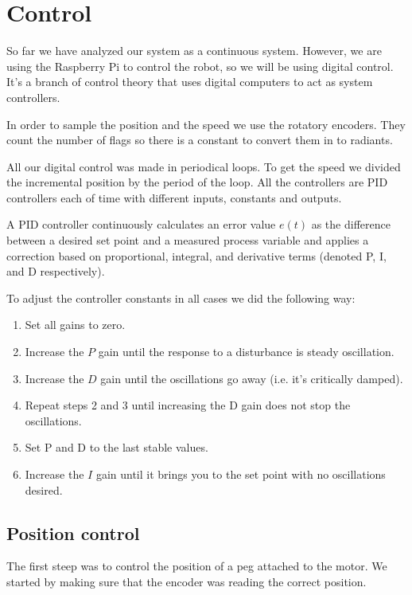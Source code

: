 \section{Control}
So far we have analyzed our system as a continuous system.
However, we are using the Raspberry Pi to control the robot, so we will
be using digital control. It's a branch of control theory that uses
digital computers to act as system controllers.

In order to sample the position and the speed we use the rotatory encoders.
They count the number of flags so there is a constant to convert them in to radiants.

All our digital control was made in periodical loops. To get the speed we
divided the incremental position by the period of the loop. All the controllers
are PID controllers each of time with different inputs, constants and outputs.

A PID controller continuously calculates an error value $e(t)$ as the difference between
a desired set point and a measured process variable and applies a
correction based on proportional, integral, and derivative terms
(denoted P, I, and D respectively).

To adjust the controller constants in all cases we did the following way:

\begin{enumerate}
    \item Set all gains to zero.
    \item Increase the $P$ gain until the response to a disturbance is steady oscillation.
    \item Increase the $D$ gain until the oscillations go away (i.e. it's critically damped).
    \item Repeat steps 2 and 3 until increasing the D gain does not stop the oscillations.
    \item Set P and D to the last stable values.
    \item Increase the $I$ gain until it brings you to the set point with no oscillations desired.
\end{enumerate}

\subsection{Position control}
The first steep was to control the position of a peg attached to the motor.
We started by making sure that the encoder was reading the correct position.


